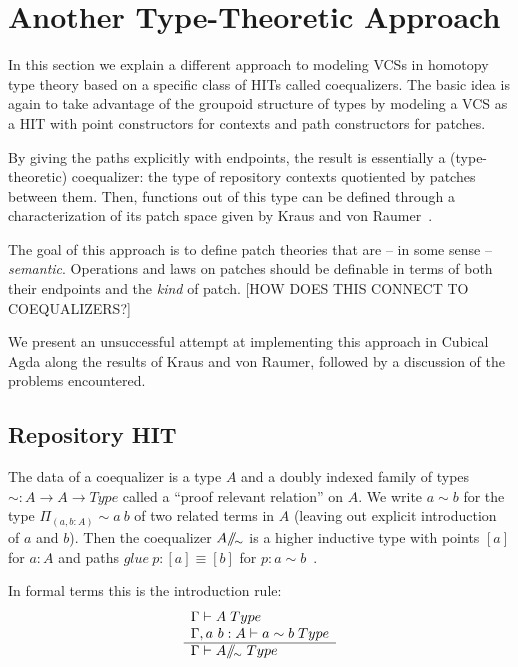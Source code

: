 \section{Another Type-Theoretic Approach}\label{sec:attempt}

In this section we explain a different approach to modeling VCSs in homotopy
type theory based on a specific class of HITs called coequalizers. The basic
idea is again to take advantage of the groupoid structure of types by modeling a
VCS as a HIT with point constructors for contexts and path constructors for
patches.

By giving the paths explicitly with endpoints, the result is essentially a
(type-theoretic) coequalizer: the type of repository contexts quotiented by
patches between them. Then, functions out of this type can be defined through a
characterization of its patch space given by Kraus and von Raumer~\cite{kraus2019path}.

The goal of this approach is to define patch theories that are -- in some sense
-- \emph{semantic}. Operations and laws on patches should be definable in terms
of both their endpoints and the \emph{kind} of patch. [HOW DOES THIS CONNECT TO
COEQUALIZERS?]

We present an unsuccessful attempt at implementing this approach in Cubical Agda
along the results of Kraus and von Raumer, followed by a discussion of the
problems encountered.

\subsection{Repository HIT}

The data of a coequalizer is a type $A$ and a doubly indexed family of types $\sim : A
\rightarrow A \rightarrow Type$ called a ``proof relevant relation'' on $A$. We
write $a \sim b$ for the type $\Pi_{(a,b : A)} \sim a~b$ of two related terms in
$A$ (leaving out explicit introduction of $a$ and $b$).
Then the coequalizer $A /\!\!/\!_{\sim}$ is a higher inductive type with points $[a]$ for
$a : A$ and paths $glue~p : [a] \equiv [b]$ for $p : a \sim b$~\cite{kraus2019path}.

In formal terms this is the introduction rule:
\begin{equation}
  \label{eq:coequalizer-intro}
  \begin{array}[t]{l}
    \Gamma \vdash A \; Type\\
    \Gamma, a~b : A \vdash a \sim b \; Type\\
    \hline
    \Gamma \vdash A /\!\!/\!_{\sim} \; Type\\
  \end{array}
\end{equation}

